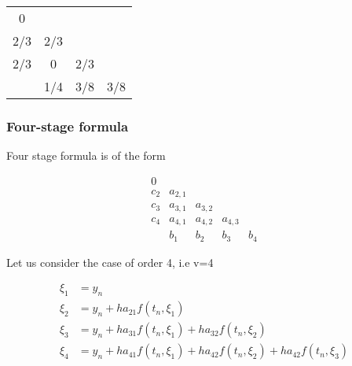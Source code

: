 \documentclass[12pt,a4paper]{article}
\begin{document}
\begin{center}
\begin{tabular}{c|ccc}
0\\
2/3&2/3\\
2/3&0&2/3\\
\hline
&1/4&3/8&3/8
\end{tabular}
\end{center}

\subsubsection{Four-stage formula}
Four stage formula is of the form

\begin{equation*}
  \begin{array}{c|cccc}
    0       \\
    c_2       & a_{2,1}  \\
    c_3    &a_{3,1}   &a_{3,2}  \\
    c_4    &a_{4,1}   &a_{4,2}  &a_{4,3} \\
    \hline
    \,        & b_1      & b_2     & b_3  & b_4
  \end{array}
\end{equation*}

Let us consider the case of order 4, i.e v=4

\begin{align*}
\xi_1 &= y_n \\
\xi_2 &= y_n + ha_{21}f(t_n, \xi_1) \\
\xi_3 &= y_n + ha_{31}f(t_n, \xi_1) + ha_{32}f(t_n, \xi_2) \\
\xi_4 &= y_n + ha_{41}f(t_n, \xi_1) + ha_{42}f(t_n, \xi_2)+ ha_{42}f(t_n, \xi_3) 
\end{align*}
 
\end{document}
